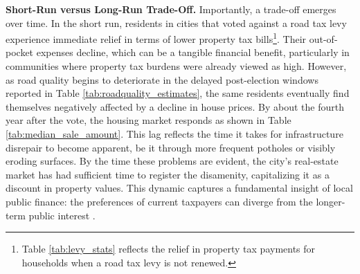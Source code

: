 
{\bf Short-Run versus Long-Run Trade-Off.} Importantly, a trade-off emerges over time. In the short run, residents in cities that voted against a road tax levy experience immediate relief in terms of lower property tax bills\footnote{Table \ref{tab:levy_stats} reflects the relief in property tax payments for households when a road tax levy is not renewed.}. Their out-of-pocket expenses decline, which can be a tangible financial benefit, particularly in communities where property tax burdens were already viewed as high. However, as road quality begins to deteriorate in the delayed post-election windows reported in Table \ref{tab:roadquality_estimates}, the same residents eventually find themselves negatively affected by a decline in house prices. By about the fourth year after the vote, the housing market responds as shown in Table \ref{tab:median_sale_amount}. This lag reflects the time it takes for infrastructure disrepair to become apparent, be it through more frequent potholes or visibly eroding surfaces. By the time these problems are evident, the city’s real-estate market has had sufficient time to register the disamenity, capitalizing it as a discount in property values. This dynamic captures a fundamental insight of local public finance: the preferences of current taxpayers can diverge from the longer-term public interest \citep{BuchananTullock1962, AlesinaTabellini1990}. 



